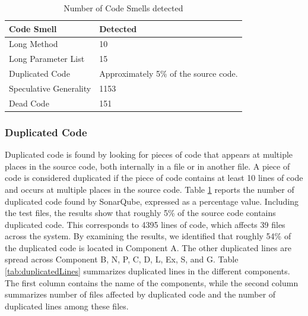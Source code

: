 \begin{table}[]
\centering
\caption{Number of Code Smells detected}
\label{tab:identifiedCodeSmell}
\begin{tabular}{|l|p{3cm}|}
\hline
\textbf{Code Smell}                           & \textbf{Detected}    \\ \hline
Long Method                                   & 10          \\ \hline
Long Parameter List                           & 15          \\ \hline
Duplicated Code                               & Approximately 5\% of the source code.  \\ \hline
Speculative Generality                        & 1153      \\ \hline
Dead Code 									  & 151 \\ \hline
\end{tabular}
\end{table}

\subsubsection{Duplicated Code}
Duplicated code is found by looking for pieces of code that appears at multiple places in the source code, both internally in a file or in another file. A piece of code is considered duplicated if the piece of code contains at least 10 lines of code and occurs at multiple places in the source code. Table \ref{tab:identifiedCodeSmell} reports the number of duplicated code found by SonarQube, expressed as a percentage value. Including the test files, the results show that roughly 5\% of the source code contains duplicated code. This corresponds to 4395 lines of code, which affects 39 files across the system. By examining the results, we identified that roughly 54\% of the duplicated code is located in Component A. The other duplicated lines are spread across Component B, N, P, C, D, L, Ex, S, and G. Table \ref{tab:duplicatedLines} summarizes duplicated lines in the different components. The first column contains the name of the components, while the second column summarizes number of files affected by duplicated code and the number of duplicated lines among these files.

